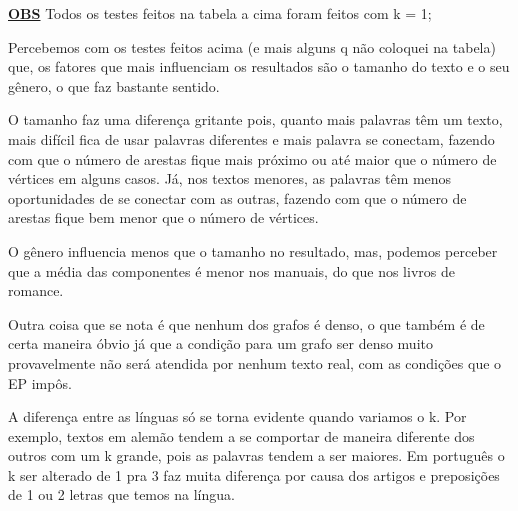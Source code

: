 \documentclass[12pt]{article}
\newcommand{\mytitle}[1]{\textbf{\underline{#1}}}
\begin{document}
\mytitle{OBS} Todos os testes feitos na tabela a cima foram feitos com k = 1;

Percebemos com os testes feitos acima (e mais alguns q não coloquei na tabela) que, os fatores que mais influenciam os resultados são o tamanho do texto e o seu gênero, o que faz bastante sentido.

O tamanho faz uma diferença gritante pois, quanto mais palavras têm um texto, mais difícil fica de usar palavras diferentes e mais palavra se conectam, fazendo com que o número de arestas fique mais próximo ou até maior que o número de vértices em alguns casos. Já, nos textos menores, as palavras têm menos oportunidades de se conectar com as outras, fazendo com que o número de arestas fique bem menor que o número de vértices.

O gênero influencia menos que o tamanho no resultado, mas, podemos perceber que a média das componentes é menor nos manuais, do que nos livros de romance.

Outra coisa que se nota é que nenhum dos grafos é denso, o que também é de certa maneira óbvio já que a condição para um grafo ser denso muito provavelmente não será atendida por nenhum texto real, com as condições que o EP impôs.

A diferença entre as línguas só se torna evidente quando variamos o k. Por exemplo, textos em alemão tendem a se comportar de maneira diferente dos outros com um k grande, pois as palavras tendem a ser maiores. Em português o k ser alterado de 1 pra 3 faz muita diferença por causa dos artigos e preposições de 1 ou 2 letras que temos na língua.
\end{document}
